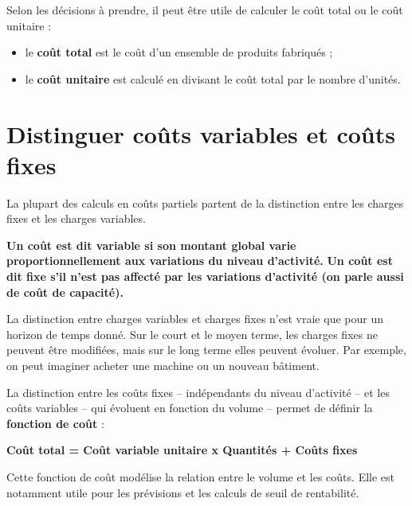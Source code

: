 \documentclass[oneside]{kaobook}
\begin{document}
Selon les décisions à prendre, il peut être utile de calculer le coût total ou le coût unitaire :
\begin{itemize}
\item le \textbf{coût total} est le coût d'un ensemble de produits fabriqués ;
\item le \textbf{coût unitaire} est calculé en divisant le coût total par le nombre d'unités.
\end{itemize}

\section{Distinguer coûts variables et coûts fixes}
\label{sec:orga61be25}
La plupart des calculs en coûts partiels partent de la distinction entre les charges fixes et les charges variables.
\begin{center}
\textbf{Un coût est dit variable si son montant global varie proportionnellement aux variations du niveau d'activité.}
\textbf{Un coût est dit fixe s'il n'est pas affecté par les variations d'activité (on parle aussi de coût de capacité).}
\end{center}
La distinction entre charges variables et charges fixes n'est vraie que pour un horizon de temps donné. Sur le court et le moyen terme, les charges fixes ne peuvent être modifiées, mais sur le long terme elles peuvent évoluer. Par exemple, on peut imaginer acheter une machine ou un nouveau bâtiment.

La distinction entre les coûts fixes – indépendants du niveau d'activité – et les coûts variables – qui évoluent en fonction du volume – permet de définir la \textbf{fonction de coût} :
\begin{center}
\textbf{Coût total = Coût variable unitaire x Quantités + Coûts fixes}
\end{center}
Cette fonction de coût modélise la relation entre le volume et les coûts. Elle est notamment utile pour les prévisions et les calculs de seuil de rentabilité.
\end{document}
